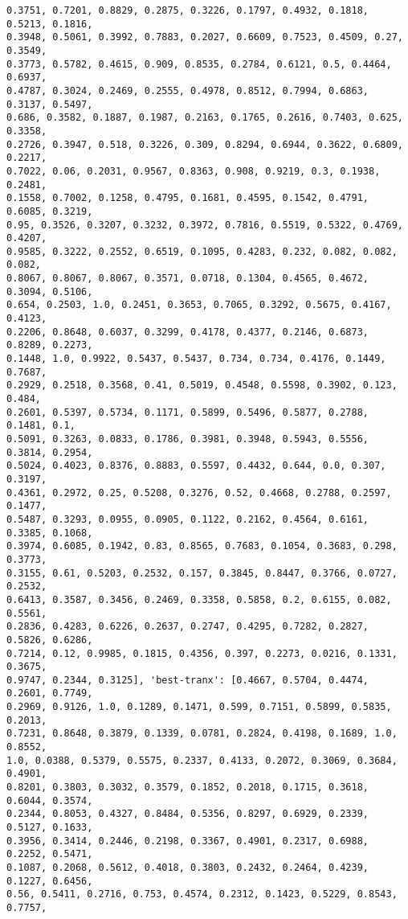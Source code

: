 \documentclass[11pt]{article}
\begin{document}
\begin{Verbatim}[commandchars=\\\{\}]
0.3751, 0.7201, 0.8829, 0.2875, 0.3226, 0.1797, 0.4932, 0.1818, 0.5213, 0.1816,
0.3948, 0.5061, 0.3992, 0.7883, 0.2027, 0.6609, 0.7523, 0.4509, 0.27, 0.3549,
0.3773, 0.5782, 0.4615, 0.909, 0.8535, 0.2784, 0.6121, 0.5, 0.4464, 0.6937,
0.4787, 0.3024, 0.2469, 0.2555, 0.4978, 0.8512, 0.7994, 0.6863, 0.3137, 0.5497,
0.686, 0.3582, 0.1887, 0.1987, 0.2163, 0.1765, 0.2616, 0.7403, 0.625, 0.3358,
0.2726, 0.3947, 0.518, 0.3226, 0.309, 0.8294, 0.6944, 0.3622, 0.6809, 0.2217,
0.7022, 0.06, 0.2031, 0.9567, 0.8363, 0.908, 0.9219, 0.3, 0.1938, 0.2481,
0.1558, 0.7002, 0.1258, 0.4795, 0.1681, 0.4595, 0.1542, 0.4791, 0.6085, 0.3219,
0.95, 0.3526, 0.3207, 0.3232, 0.3972, 0.7816, 0.5519, 0.5322, 0.4769, 0.4207,
0.9585, 0.3222, 0.2552, 0.6519, 0.1095, 0.4283, 0.232, 0.082, 0.082, 0.082,
0.8067, 0.8067, 0.8067, 0.3571, 0.0718, 0.1304, 0.4565, 0.4672, 0.3094, 0.5106,
0.654, 0.2503, 1.0, 0.2451, 0.3653, 0.7065, 0.3292, 0.5675, 0.4167, 0.4123,
0.2206, 0.8648, 0.6037, 0.3299, 0.4178, 0.4377, 0.2146, 0.6873, 0.8289, 0.2273,
0.1448, 1.0, 0.9922, 0.5437, 0.5437, 0.734, 0.734, 0.4176, 0.1449, 0.7687,
0.2929, 0.2518, 0.3568, 0.41, 0.5019, 0.4548, 0.5598, 0.3902, 0.123, 0.484,
0.2601, 0.5397, 0.5734, 0.1171, 0.5899, 0.5496, 0.5877, 0.2788, 0.1481, 0.1,
0.5091, 0.3263, 0.0833, 0.1786, 0.3981, 0.3948, 0.5943, 0.5556, 0.3814, 0.2954,
0.5024, 0.4023, 0.8376, 0.8883, 0.5597, 0.4432, 0.644, 0.0, 0.307, 0.3197,
0.4361, 0.2972, 0.25, 0.5208, 0.3276, 0.52, 0.4668, 0.2788, 0.2597, 0.1477,
0.5487, 0.3293, 0.0955, 0.0905, 0.1122, 0.2162, 0.4564, 0.6161, 0.3385, 0.1068,
0.3974, 0.6085, 0.1942, 0.83, 0.8565, 0.7683, 0.1054, 0.3683, 0.298, 0.3773,
0.3155, 0.61, 0.5203, 0.2532, 0.157, 0.3845, 0.8447, 0.3766, 0.0727, 0.2532,
0.6413, 0.3587, 0.3456, 0.2469, 0.3358, 0.5858, 0.2, 0.6155, 0.082, 0.5561,
0.2836, 0.4283, 0.6226, 0.2637, 0.2747, 0.4295, 0.7282, 0.2827, 0.5826, 0.6286,
0.7214, 0.12, 0.9985, 0.1815, 0.4356, 0.397, 0.2273, 0.0216, 0.1331, 0.3675,
0.9747, 0.2344, 0.3125], 'best-tranx': [0.4667, 0.5704, 0.4474, 0.2601, 0.7749,
0.2969, 0.9126, 1.0, 0.1289, 0.1471, 0.599, 0.7151, 0.5899, 0.5835, 0.2013,
0.7231, 0.8648, 0.3879, 0.1339, 0.0781, 0.2824, 0.4198, 0.1689, 1.0, 0.8552,
1.0, 0.0388, 0.5379, 0.5575, 0.2337, 0.4133, 0.2072, 0.3069, 0.3684, 0.4901,
0.8201, 0.3803, 0.3032, 0.3579, 0.1852, 0.2018, 0.1715, 0.3618, 0.6044, 0.3574,
0.2344, 0.8053, 0.4327, 0.8484, 0.5356, 0.8297, 0.6929, 0.2339, 0.5127, 0.1633,
0.3956, 0.3414, 0.2446, 0.2198, 0.3367, 0.4901, 0.2317, 0.6988, 0.2252, 0.5471,
0.1087, 0.2068, 0.5612, 0.4018, 0.3803, 0.2432, 0.2464, 0.4239, 0.1227, 0.6456,
0.56, 0.5411, 0.2716, 0.753, 0.4574, 0.2312, 0.1423, 0.5229, 0.8543, 0.7757,

\end{Verbatim}
\end{document}
